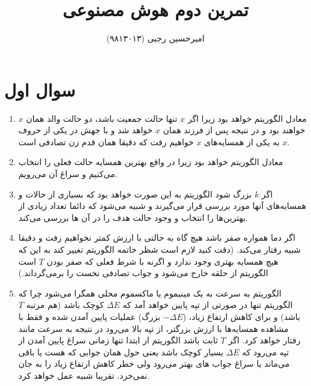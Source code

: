 \documentclass{article}
\title{
	تمرین دوم هوش مصنوعی
}
\author{
	امیرحسین رجبی (۹۸۱۳۰۱۳)
}
\begin{document}
	\maketitle
	\section*{
		سوال اول
	}
	\begin{enumerate}
		\item 
		معادل الگوریتم 
		خواهد بود زیرا اگر $x$ تنها حالت جمعیت باشد، دو حالت والد همان $x$ خواهند بود و در نتیجه پس از
		فرزند همان $x$ خواهد شد و با جهش در یکی از حروف $x$ به یکی از همسایه‌های $x$ خواهیم رفت که دقیقا همان قدم زن تصادفی است.
		
	\item 
	معادل الگوریتم 
	خواهد بود زیرا در واقع بهترین همسایه حالت فعلی را انتخاب می‌کنیم و سراغ آن می‌رویم.
	\item 
	اگر $k$ بزرگ شود الگوریتم به این صورت خواهد بود که بسیاری از حالات و همسایه‌های آنها مورد بررسی قرار می‌گیرند و شبیه 
	می‌شود که دائما تعداد زیادی از بهترین‌ها را انتخاب و وجود حالت هدف را در آن ها بررسی می‌کند.
	\item 
	اگر دما همواره صفر باشد هیچ گاه به حالتی با ارزش کمتر نخواهیم رفت و دقیقا شبیه 
	رفتار می‌کند. (دقت کنید لازم است شظر خاتمه الگوریتم تغییر کند به این که هیچ همسایه بهتری وجود ندارد و اگرنه با شرط فعلی که صفر بودن $T$ است الگوریتم از حلقه خارج می‌شود و جواب تصادفی نخست را برمی‌گرداند.)
	\item
	الگوریتم به سرعت به یک مینیموم یا ماکسموم محلی همگرا می‌شود چرا که الگوریتم تنها در صورتی از تپه پایین خواهد آمد که
	$\Delta E$
	کوچک باشد (هم مرتبه $T$ باشد) و برای کاهش ارتفاع زیاد، ($-\Delta E$ بزرگ) عملیات پایین آمدن 
	شده و فقط با مشاهده همسایه‌ها با ارزش بزرگتر، از تپه بالا می‌رود در نتیجه به سرعت مانند 
	رفتار خواهد کرد. اگر $T$ ثابت باشد الگوریتم از ابتدا تنها زمانی سراغ پایین آمدن از تپه می‌رود که 
	$\Delta E$
	بسیار کوچک باشد یعنی حول همان جوابی که هست یا باقی می‌ماند یا سراغ جواب های بهتر می‌رود ولی خطر کاهش ارتفاع زیاد را به جان نمی‌خرد. تقریبا شبیه 
	عمل خواهد کرد.
	\end{enumerate}
\end{document}
